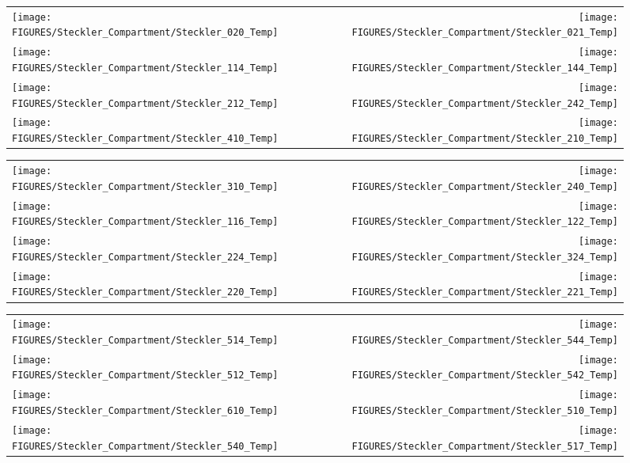 \begin{figure}[p]
\begin{tabular*}{\textwidth}{l@{\extracolsep{\fill}}r}
\texttt{[image: FIGURES/Steckler\_Compartment/Steckler\_020\_Temp]} &
\texttt{[image: FIGURES/Steckler\_Compartment/Steckler\_021\_Temp]} \\
\texttt{[image: FIGURES/Steckler\_Compartment/Steckler\_114\_Temp]} &
\texttt{[image: FIGURES/Steckler\_Compartment/Steckler\_144\_Temp]} \\
\texttt{[image: FIGURES/Steckler\_Compartment/Steckler\_212\_Temp]} &
\texttt{[image: FIGURES/Steckler\_Compartment/Steckler\_242\_Temp]} \\
\texttt{[image: FIGURES/Steckler\_Compartment/Steckler\_410\_Temp]} &
\texttt{[image: FIGURES/Steckler\_Compartment/Steckler\_210\_Temp]}
\end{tabular*}
\label{Steckler_Temp_3}
\end{figure}

\begin{figure}[p]
\begin{tabular*}{\textwidth}{l@{\extracolsep{\fill}}r}
\texttt{[image: FIGURES/Steckler\_Compartment/Steckler\_310\_Temp]} &
\texttt{[image: FIGURES/Steckler\_Compartment/Steckler\_240\_Temp]} \\
\texttt{[image: FIGURES/Steckler\_Compartment/Steckler\_116\_Temp]} &
\texttt{[image: FIGURES/Steckler\_Compartment/Steckler\_122\_Temp]} \\
\texttt{[image: FIGURES/Steckler\_Compartment/Steckler\_224\_Temp]} &
\texttt{[image: FIGURES/Steckler\_Compartment/Steckler\_324\_Temp]} \\
\texttt{[image: FIGURES/Steckler\_Compartment/Steckler\_220\_Temp]} &
\texttt{[image: FIGURES/Steckler\_Compartment/Steckler\_221\_Temp]}
\end{tabular*}
\label{Steckler_Temp_4}
\end{figure}

\begin{figure}[p]
\begin{tabular*}{\textwidth}{l@{\extracolsep{\fill}}r}
\texttt{[image: FIGURES/Steckler\_Compartment/Steckler\_514\_Temp]} &
\texttt{[image: FIGURES/Steckler\_Compartment/Steckler\_544\_Temp]} \\
\texttt{[image: FIGURES/Steckler\_Compartment/Steckler\_512\_Temp]} &
\texttt{[image: FIGURES/Steckler\_Compartment/Steckler\_542\_Temp]} \\
\texttt{[image: FIGURES/Steckler\_Compartment/Steckler\_610\_Temp]} &
\texttt{[image: FIGURES/Steckler\_Compartment/Steckler\_510\_Temp]} \\
\texttt{[image: FIGURES/Steckler\_Compartment/Steckler\_540\_Temp]} &
\texttt{[image: FIGURES/Steckler\_Compartment/Steckler\_517\_Temp]}
\end{tabular*}
\label{Steckler_Temp_5}
\end{figure}

